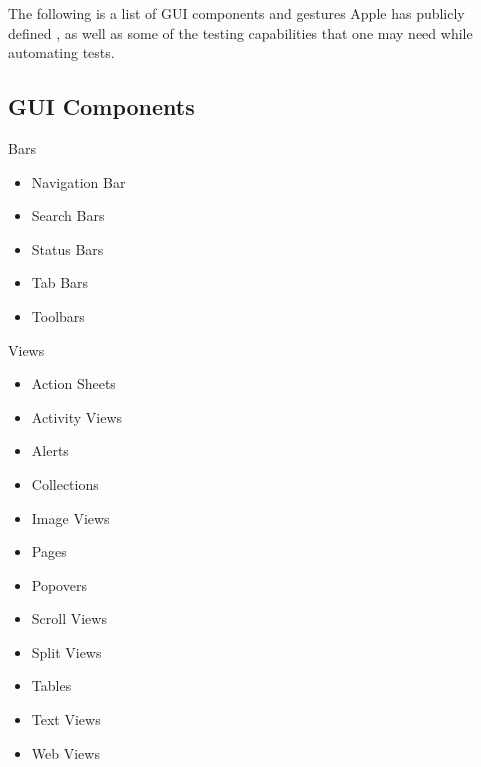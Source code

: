 The following is a list of GUI components and gestures Apple has publicly defined \cite{AppleHumanInterface}, as well as some of the testing capabilities that one may need while automating tests. 

\subsection {GUI Components}
	
	Bars
	\begin{itemize}
  		\vspace{-0.4cm}\item Navigation Bar
  		\vspace{-0.4cm}\item Search Bars
		\vspace{-0.4cm}\item Status Bars
		\vspace{-0.4cm}\item Tab Bars
		\vspace{-0.4cm}\item Toolbars
	\end{itemize}

	Views
	\begin{itemize}
  		\vspace{-0.4cm}\item Action Sheets
		\vspace{-0.4cm}\item Activity Views
		\vspace{-0.4cm}\item Alerts
		\vspace{-0.4cm}\item Collections
		\vspace{-0.4cm}\item Image Views
		\vspace{-0.4cm}\item Pages
		\vspace{-0.4cm}\item Popovers
		\vspace{-0.4cm}\item Scroll Views
		\vspace{-0.4cm}\item Split Views
		\vspace{-0.4cm}\item Tables
		\vspace{-0.4cm}\item Text Views
		\vspace{-0.4cm}\item Web Views
	\end{itemize}
	
